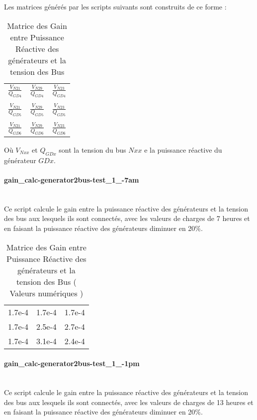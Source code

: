 Les matrices générés par les scripts suivants sont construits de ce forme :

\begin{table}[H]
	\captionsetup{justification=centering,margin=2cm}
	\caption{Matrice des Gain entre Puissance Réactive des générateurs et la tension des Bus}
	\centering
	\begin{tabular}{ccc}
		$ \frac{V_{N21}}{Q_{GD4}} $&$ \frac{V_{N29}}{Q_{GD4}} $&$ \frac{V_{N23}}{Q_{GD4}} $\\
		&&\\
		$ \frac{V_{N21}}{Q_{GD5}} $&$ \frac{V_{N29}}{Q_{GD5}} $&$ \frac{V_{N23}}{Q_{GD5}} $\\
		&&\\
		$ \frac{V_{N21}}{Q_{GD6}} $&$ \frac{V_{N29}}{Q_{GD6}} $&$ \frac{V_{N23}}{Q_{GD6}} $\\
	\end{tabular}
\end{table}

Où $ V_{Nxx} $ et $ Q_{GDx} $ sont la tension du bus $ Nxx $ e la puissance réactive du générateur $ GDx $.
\paragraph{gain\_calc-generator2bus-test\_1\_-7am\\\\}
Ce script calcule le gain entre la puissance réactive des générateurs et la tension des bus aux lesquels ils sont connectés, avec les valeurs de charges de 7 heures et en faisant la puissance réactive des générateurs diminuer en 20\%.
\begin{table}[H]
	\captionsetup{justification=centering,margin=2cm}
	\caption{Matrice des Gain entre Puissance Réactive des générateurs et la tension des Bus ( Valeurs numériques )}
	\centering
	\begin{tabular}{ccc}
		1.7e-4&1.7e-4&1.7e-4\\
		1.7e-4&2.5e-4&2.7e-4\\
		1.7e-4&3.1e-4&2.4e-4\\
	\end{tabular}
\end{table}

\paragraph{gain\_calc-generator2bus-test\_1\_-1pm\\\\}
Ce script calcule le gain entre la puissance réactive des générateurs et la tension des bus aux lesquels ils sont connectés, avec les valeurs de charges de 13 heures et en faisant la puissance réactive des générateurs diminuer en 20\%.

